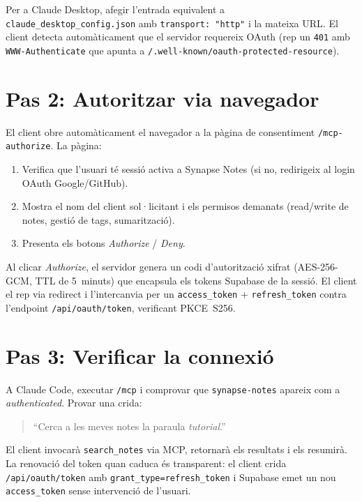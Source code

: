 Per a Claude Desktop, afegir l'entrada equivalent a \texttt{claude\_desktop\_config.json} amb \texttt{transport: "http"} i la mateixa URL. El client detecta automàticament que el servidor requereix OAuth (rep un \texttt{401} amb \texttt{WWW-Authenticate} que apunta a \texttt{/.well-known/oauth-protected-resource}).

\section*{Pas 2: Autoritzar via navegador}

El client obre automàticament el navegador a la pàgina de consentiment \texttt{/mcp-authorize}. La pàgina:

\begin{enumerate}
    \item Verifica que l'usuari té sessió activa a Synapse Notes (si no, redirigeix al login OAuth Google/GitHub).
    \item Mostra el nom del client sol·licitant i els permisos demanats (read/write de notes, gestió de tags, sumarització).
    \item Presenta els botons \emph{Authorize} / \emph{Deny}.
\end{enumerate}

Al clicar \emph{Authorize}, el servidor genera un codi d'autorització xifrat (AES-256-GCM, TTL de 5~minuts) que encapsula els tokens Supabase de la sessió. El client el rep via redirect i l'intercanvia per un \texttt{access\_token} + \texttt{refresh\_token} contra l'endpoint \texttt{/api/oauth/token}, verificant PKCE~S256.

\section*{Pas 3: Verificar la connexió}

A Claude Code, executar \texttt{/mcp} i comprovar que \texttt{synapse-notes} apareix com a \emph{authenticated}. Provar una crida:

\begin{quote}
``Cerca a les meves notes la paraula \emph{tutorial}.''
\end{quote}

El client invocarà \texttt{search\_notes} via MCP, retornarà els resultats i els resumirà. La renovació del token quan caduca és transparent: el client crida \texttt{/api/oauth/token} amb \texttt{grant\_type=refresh\_token} i Supabase emet un nou \texttt{access\_token} sense intervenció de l'usuari.

